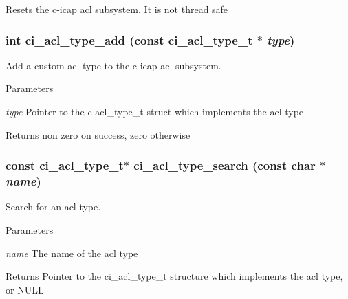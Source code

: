 Resets the c-\/icap acl subsystem. It is not thread safe \hypertarget{group__ACL_ga20a6c804c70afdb1fe0ec28a516e113f}{
\subsubsection[{ci\_\-acl\_\-type\_\-add}]{\setlength{\rightskip}{0pt plus 5cm}int ci\_\-acl\_\-type\_\-add (const {\bf ci\_\-acl\_\-type\_\-t} $\ast$ {\em type})}}
\label{group__ACL_ga20a6c804c70afdb1fe0ec28a516e113f}


Add a custom acl type to the c-\/icap acl subsystem. 
\begin{DoxyParams}{Parameters}
\item[{\em type}]Pointer to the c-\/acl\_\-type\_\-t struct which implements the acl type \end{DoxyParams}
\begin{DoxyReturn}{Returns}
non zero on success, zero otherwise 
\end{DoxyReturn}
\hypertarget{group__ACL_ga7ee2105ebc7574e0e0a73e9a0069cbdb}{
\subsubsection[{ci\_\-acl\_\-type\_\-search}]{\setlength{\rightskip}{0pt plus 5cm}const {\bf ci\_\-acl\_\-type\_\-t}$\ast$ ci\_\-acl\_\-type\_\-search (const char $\ast$ {\em name})}}
\label{group__ACL_ga7ee2105ebc7574e0e0a73e9a0069cbdb}


Search for an acl type. 
\begin{DoxyParams}{Parameters}
\item[{\em name}]The name of the acl type \end{DoxyParams}
\begin{DoxyReturn}{Returns}
Pointer to the ci\_\-acl\_\-type\_\-t structure which implements the acl type, or NULL 
\end{DoxyReturn}
